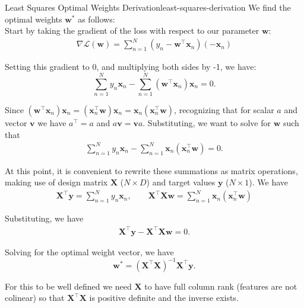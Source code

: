 \begin{derivation}{Least Squares Optimal Weights Derivation}{least-squares-derivation}
    We find the optimal weights $\textbf{w}^{*}$ as follows: \\

    Start by taking the gradient of the loss with respect to our parameter $\textbf{w}$:
    \begin{align*}
        \nabla \mathcal{L}(\textbf{w}) = \sum_{n=1}^{N} (y_{n} - \textbf{w}^\top\textbf{x}_{n})(-\textbf{x}_{n})
    \end{align*}

    Setting this gradient to 0, and multiplying both sides by -1, we have:
    \begin{equation}
      \label{least-squares-solving-for-w}
      \sum_{n=1}^{N} y_{n} \textbf{x}_{n} - \sum_{n=1}^N (\textbf{w}^\top\textbf{x}_n)\textbf{x}_n=0.
    \end{equation}


   Since $(\textbf{w}^\top\textbf{x}_n)\textbf{x}_n=(\textbf{x}_n^\top\textbf{w})\textbf{x}_n=\textbf{x}_n(\textbf{x}_n^\top\textbf{w})$,  recognizing that for scalar $a$ and vector $\mathbf{v}$ we have $a^\top=a$ and $a\mathbf{v}=\mathbf{v}a$. 
Substituting, we want to solve for $\mathbf{w}$ such that
%
\begin{align*}
  \sum_{n=1}^{N} y_{n} \textbf{x}_{n} - \sum_{n=1}^N \textbf{x}_n(\textbf{x}_n^\top\textbf{w}) =0.
\end{align*}



At this point, it is convenient to rewrite these summations as matrix operations, making use of design matrix $\textbf{X}$ ($N\times D$) and target values $\textbf{y}$ ($N\times 1$).
We have
\begin{align*}
  \textbf{X}^\top\textbf{y}=\sum_{n=1}^N y_n \textbf{x}_n, \quad\quad
  \textbf{X}^\top\textbf{X}\textbf{w}=\sum_{n=1}^N\textbf{x}_n(\textbf{x}_n^\top\textbf{w})
\end{align*}

Substituting, we have 
    \begin{align*}
         \textbf{X}^\top\textbf{y} - \textbf{X}^\top\textbf{X}\textbf{w} = 0.
    \end{align*}

    Solving for the optimal weight vector, we have 
    \begin{equation} \label{least-squares-solved-for-w}
        \textbf{w}^{*} = (\textbf{X}^\top\textbf{X})^{-1}\textbf{X}^\top\textbf{y}.
      \end{equation}

For this to be well defined we need $\textbf{X}$ to have full column rank (features are not colinear) so that $\textbf{X}^\top\textbf{X}$ is positive definite and the inverse exists.
\end{derivation}

